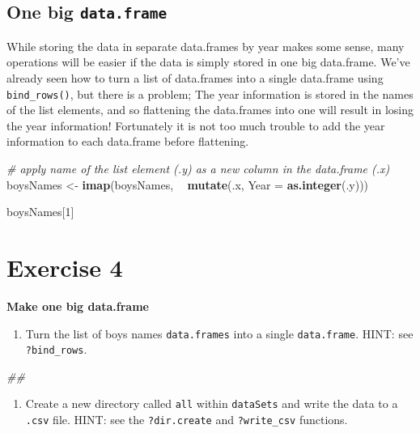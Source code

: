\documentclass[]{book}
\newenvironment{Shaded}{\begin{snugshade}}{\end{snugshade}}
\newcommand{\CommentTok}[1]{\textcolor[rgb]{0.56,0.35,0.01}{\textit{#1}}}
\newcommand{\DataTypeTok}[1]{\textcolor[rgb]{0.13,0.29,0.53}{#1}}
\newcommand{\DecValTok}[1]{\textcolor[rgb]{0.00,0.00,0.81}{#1}}
\newcommand{\KeywordTok}[1]{\textcolor[rgb]{0.13,0.29,0.53}{\textbf{#1}}}
\newcommand{\NormalTok}[1]{#1}
\newcommand{\OperatorTok}[1]{\textcolor[rgb]{0.81,0.36,0.00}{\textbf{#1}}}
\newcommand{\StringTok}[1]{\textcolor[rgb]{0.31,0.60,0.02}{#1}}
\providecommand{\tightlist}{%
  \setlength{\itemsep}{0pt}\setlength{\parskip}{0pt}}
\begin{document}
\hypertarget{one-big-data.frame}{%
\subsection{\texorpdfstring{One big \texttt{data.frame}}{One big data.frame}}\label{one-big-data.frame}}

While storing the data in separate data.frames by year makes some sense,
many operations will be easier if the data is simply stored in one big
data.frame. We've already seen how to turn a list of data.frames into a
single data.frame using \texttt{bind\_rows()}, but there is a problem; The year
information is stored in the names of the list elements, and so
flattening the data.frames into one will result in losing the year
information! Fortunately it is not too much trouble to add the year
information to each data.frame before flattening.

\begin{Shaded}
\begin{Highlighting}[]
\CommentTok{# apply name of the list element (.y) as a new column in the data.frame (.x)}
\NormalTok{boysNames <-}\StringTok{ }\KeywordTok{imap}\NormalTok{(boysNames, }\OperatorTok{~}\StringTok{ }\KeywordTok{mutate}\NormalTok{(.x, }\DataTypeTok{Year =} \KeywordTok{as.integer}\NormalTok{(.y)))}

\NormalTok{boysNames[}\DecValTok{1}\NormalTok{]}
\end{Highlighting}
\end{Shaded}

\hypertarget{exercise-4-1}{%
\section{Exercise 4}\label{exercise-4-1}}

\textbf{Make one big data.frame}

\begin{enumerate}
\def\labelenumi{\arabic{enumi}.}
\tightlist
\item
  Turn the list of boys names \texttt{data.frames} into a single \texttt{data.frame}. HINT: see \texttt{?bind\_rows}.
\end{enumerate}

\begin{Shaded}
\begin{Highlighting}[]
\CommentTok{## }
\end{Highlighting}
\end{Shaded}

\begin{enumerate}
\def\labelenumi{\arabic{enumi}.}
\setcounter{enumi}{1}
\tightlist
\item
  Create a new directory called \texttt{all} within \texttt{dataSets} and write the data to a \texttt{.csv} file.
  HINT: see the \texttt{?dir.create} and \texttt{?write\_csv} functions.
\end{enumerate}
\end{document}
